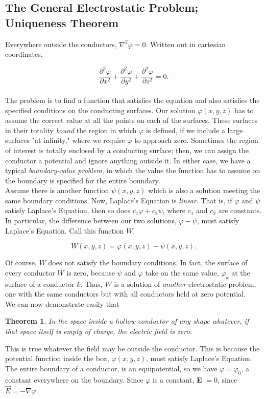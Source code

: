 \documentclass[svgnames]{article}
\newtheorem{theorem}{Theorem}		%
\begin{document}
\subsection{The General Electrostatic Problem; Uniqueness Theorem}

Everywhere outside the conductors, $\nabla^2 \varphi = 0$. Written out in
cartesian coordinates, 

\[
\frac{\partial^2\varphi}{\partial x^2} + \frac{\partial^2\varphi}{\partial y^2}
+ \frac{\partial^2\varphi}{\partial z^2} = 0
.\] \\

The problem is to find a function that satisfies the equation and also
satisfies the specified conditions on the conducting surfaces. Our solution
$\varphi (x,y,z)$ has to assume the correct value at all the points on each of
the surfaces. These surfaces in their totality \textit{bound} the region in
which $\varphi$ is defined, if we include a large surfaces "at infinity," where
we require $\varphi$ to approach zero. Sometimes the region of interest is
totally enclosed by a conducting surface; then, we can assign the conductor
a potential and ignore anything outside it. In either case, we have a typical
\textit{boundary-value problem}, in which the value the function has to assume
on the boundary is specified for the entire boundary.\\

Assume there is another function $\psi(x,y,z)$ which is also a solution
meeting the same boundary conditions. Now, Laplace's Equation is
\textit{linear}. That is, if $\varphi$ and $\psi$ satisfy Laplace's
Equation, then so does $c_1\varphi + c_2\psi$, where $c_1$ and $c_2$ are
constants. In particular, the difference between our two solutions, $\varphi
- \psi$, must satisfy Laplace's Equation. Call this function $W$. 

\[
W(x,y,z) = \varphi(x,y,z) - \psi(x,y,z)
.\] 

Of course, $W$ does not satisfy the boundary conditions. In fact, the surface
of every conductor $W$ is zero, because $\psi$ and $\varphi$ take on the same
value, $\varphi_k$ at the surface of a conductor $k$. Thus, $W$ is a solution
of \textit{another} electrostatic problem, one with the same conductors but
with all conductors held at zero potential. \\

We can now demonstrate easily that 

\begin{theorem}
  In the space inside a hollow conductor of any shape whatever, if that space
  itself is empty of charge, the electric field is zero.
\end{theorem} 

This is true whatever the field may be outside the conductor. This is because
the potential function inside the box, $\varphi(x,y,z)$, must satisfy Laplace's
Equation. The entire boundary of a conductor, is an equipotential, so we have
$\varphi = \varphi_0$, a constant everywhere on the boundary. Since $\varphi$
is a constant, \textbf{E} $= 0$, since $\vec{E} = -\nabla \varphi$. 
\end{document}

